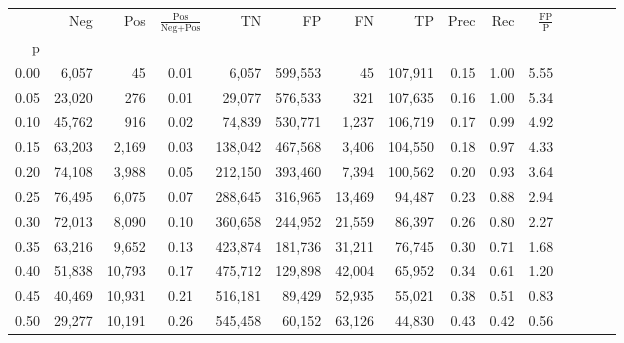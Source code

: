 \begin{tabular}{rrrcrrrrrrrrrrr}
\toprule
{} &     Neg &     Pos & $\frac{\text{Pos}}{\text{Neg}+\text{Pos}}$ &       TN &       FP &       FN &       TP &  Prec &   Rec & $\frac{\text{FP}}{\text{P}}$ \\
p    &         &         &                                            &          &          &          &          &       &       &                              \\
\midrule
0.00 &   6,057 &      45 &                                       0.01 &    6,057 &  599,553 &       45 &  107,911 &  0.15 &  1.00 &                         5.55 \\
0.05 &  23,020 &     276 &                                       0.01 &   29,077 &  576,533 &      321 &  107,635 &  0.16 &  1.00 &                         5.34 \\
0.10 &  45,762 &     916 &                                       0.02 &   74,839 &  530,771 &    1,237 &  106,719 &  0.17 &  0.99 &                         4.92 \\
0.15 &  63,203 &   2,169 &                                       0.03 &  138,042 &  467,568 &    3,406 &  104,550 &  0.18 &  0.97 &                         4.33 \\
0.20 &  74,108 &   3,988 &                                       0.05 &  212,150 &  393,460 &    7,394 &  100,562 &  0.20 &  0.93 &                         3.64 \\
0.25 &  76,495 &   6,075 &                                       0.07 &  288,645 &  316,965 &   13,469 &   94,487 &  0.23 &  0.88 &                         2.94 \\
0.30 &  72,013 &   8,090 &                                       0.10 &  360,658 &  244,952 &   21,559 &   86,397 &  0.26 &  0.80 &                         2.27 \\
0.35 &  63,216 &   9,652 &                                       0.13 &  423,874 &  181,736 &   31,211 &   76,745 &  0.30 &  0.71 &                         1.68 \\
0.40 &  51,838 &  10,793 &                                       0.17 &  475,712 &  129,898 &   42,004 &   65,952 &  0.34 &  0.61 &                         1.20 \\
0.45 &  40,469 &  10,931 &                                       0.21 &  516,181 &   89,429 &   52,935 &   55,021 &  0.38 &  0.51 &                         0.83 \\
0.50 &  29,277 &  10,191 &                                       0.26 &  545,458 &   60,152 &   63,126 &   44,830 &  0.43 &  0.42 &                         0.56 \\

\end{tabular}
